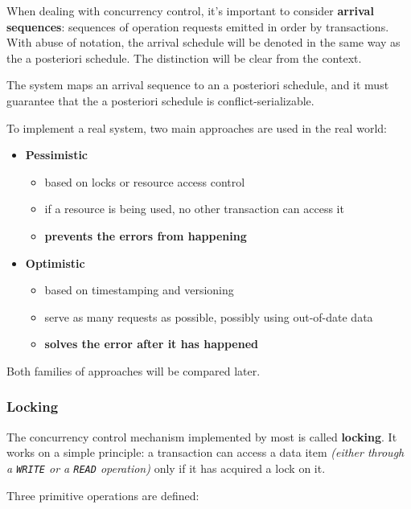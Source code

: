 \documentclass[english]{article}
\begin{document}
When dealing with concurrency control, it's important to consider \textbf{arrival sequences}: sequences of operation requests emitted in order by transactions.
With abuse of notation, the arrival schedule will be denoted in the same way as the a posteriori schedule.
The distinction will be clear from the context.

The \CC system maps an arrival sequence to an a posteriori schedule, and it must guarantee that the a posteriori schedule is conflict-serializable.

\bigskip
To implement a real \CC system, two main approaches are used in the real world:

\begin{itemize}
  \item \textbf{Pessimistic}
        \begin{itemize}
          \item based on locks or resource access control
          \item if a resource is being used, no other transaction can access it
          \item \textbf{prevents the errors from happening}
        \end{itemize}
  \item \textbf{Optimistic}
        \begin{itemize}
          \item based on timestamping and versioning
          \item serve as many requests as possible, possibly using out-of-date data
          \item \textbf{solves the error after it has happened}
        \end{itemize}
\end{itemize}

Both families of approaches will be compared later.

\subsubsection{Locking}

The concurrency control mechanism implemented by most \dbms is called \textbf{locking}.
It works on a simple principle: a transaction can access a data item \textit{(either through a \texttt{WRITE} or a \texttt{READ} operation)} only if it has acquired a lock on it.

Three primitive operations are defined:
\end{document}
